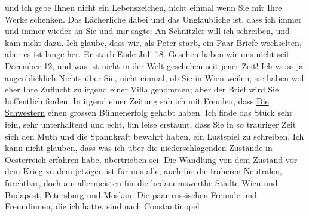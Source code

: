 \begin{ledgroupsized}[t]{13cm}
               und ich gebe Ihnen nicht ein Lebenszeichen, nicht einmal wenn Sie mir Ihre Werke
               schenken. Das Lächerliche dabei und das Unglaubliche ist, {\pb}dass ich immer und immer wieder an
               Sie \label{T_L02342_2v}\label{T_L02342_2h} und mir sagte: An Schnitzler will ich
               schreiben, und kam nicht dazu.\pend
           \pstart
           Ich glaube, dass wir, als Peter starb, ein Paar
               Briefe wechselten, aber es ist lange her. Er starb Ende Juli 18. Gesehen
               haben wir uns nicht seit December 12, und was ist nicht in der Welt
               geschehen seit jener Zeit!\pend
           \pstart
           Ich weiss ja augenblicklich Nichts über Sie, nicht einmal, ob Sie in Wien weilen, sie haben wol eher Ihre Zuflucht zu irgend einer
               Villa genommen; aber der Brief wird Sie hoffentlich finden.\pend
           \pstart
           In irgend einer Zeitung sah ich mit Freuden, dass \uline{Die Schwestern} einen grossen Bühnenerfolg gehabt haben. Ich finde das Stück sehr fein, sehr
               unterhaltend und echt, bin leise erstaunt, {\pb}dass Sie in so trauriger Zeit sich
               den Muth und die Spannkraft bewahrt haben, ein Lustspiel zu schreiben. Ich kann nicht
               glauben, dass was ich über die niederschlagenden Zustände in Oesterreich erfahren habe, übertrieben sei. Die Wandlung von dem
               Zustand vor dem Krieg zu dem jetzigen ist für uns alle, auch für die früheren
               Neutralen, furchtbar, doch am allermeisten für die bedauernswerthe Städte Wien und Budapest,
                  Petersburg und Moskau. Die paar russischen Freunde und
               Freundinnen, die ich hatte, sind nach Constantinopel

\end{ledgroupsized}
